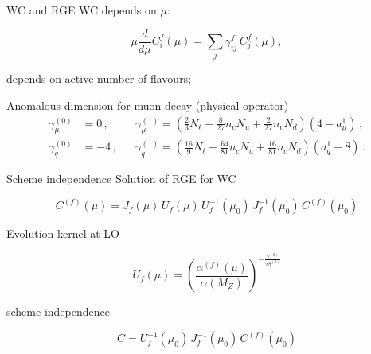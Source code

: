 \documentclass[11pt]{beamer}
\begin{document}
\begin{frame}{WC and RGE}
WC depends on $\mu$:

\begin{equation}
\mu \frac{d}{d\mu} C^f_i(\mu)
=
\sum_j \gamma^f_{ij} \, C^f_j(\mu),
\end{equation}

\begin{itemize}
depends on active number of flavours;
\end{itemize}

Anomalous dimension for muon decay (physical operator)
\begin{align}
  \gamma^{(0)}_\mu &= 0\,,  & &
  \gamma^{(1)}_\mu =
   \left( \frac{2}{3} N_\ell
    +\frac{8}{27} n_c N_u
    +\frac{2}{27} n_c N_d
   \right)(4-a^1_\mu)
  \,,\\
  \gamma^{(0)}_q   &= -4\,, & &
  \gamma^{(1)}_q = 
        \left(
          \frac{16}{9} N_\ell
         +\frac{64}{81} n_c N_u
         +\frac{16}{81} n_c N_d
         \right)(a_q^1-8)
  \,.
\end{align}



\end{frame}






\begin{frame}{Scheme independence}
Solution of RGE for WC

\begin{equation}
C^{(f)}(\mu)
=
J_f(\mu)\,
U_f(\mu)\,
U_f^{-1}(\mu_0)\,
J_f^{-1}(\mu_0)\,
C^{(f)}(\mu_0)
\end{equation}

Evolution kernel at LO

\begin{equation}
U_f(\mu)
=
\left(
\frac{\alpha^{(f)}(\mu)}
{\alpha(M_Z)}
\right)^{-\frac{\gamma^{(0)}}{2 \beta^{(0)}}}
\end{equation}

scheme independence

\begin{equation}
C = U_f^{-1}(\mu_0)\,
J_f^{-1}(\mu_0)\,
C^{(f)}(\mu_0)
\end{equation}

\end{frame}
\end{document}
